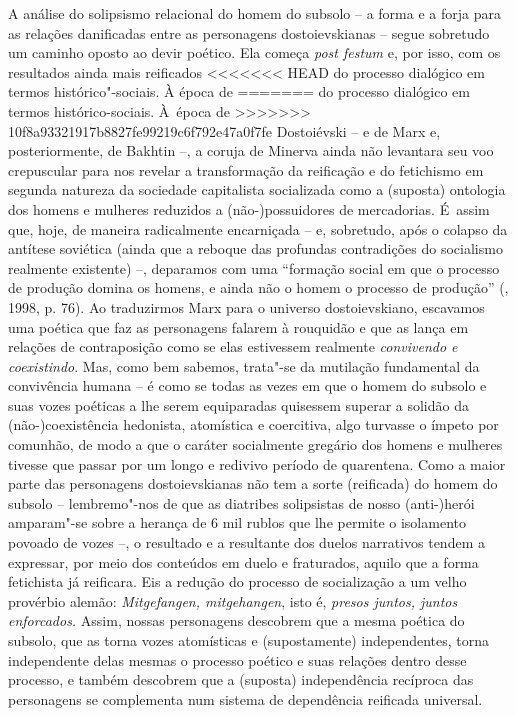 {A análise do solipsismo relacional do homem do subsolo -- a forma e a
forja para as relações danificadas entre as personagens dostoievskianas
-- segue sobretudo um caminho oposto ao devir poético. Ela começa
\emph{post festum} e, por isso, com os resultados ainda mais reificados
<<<<<<< HEAD
do processo dialógico em termos histórico"-sociais. À época de
=======
do processo dialógico em termos histórico-sociais. À~época de
>>>>>>> 10f8a93321917b8827fe99219c6f792e47a0f7fe
Dostoiévski -- e de Marx e, posteriormente, de Bakhtin --, a coruja de
Minerva ainda não levantara seu voo crepuscular para nos revelar a
transformação da reificação e do fetichismo em segunda natureza da
sociedade capitalista socializada como a (suposta) ontologia dos homens
e mulheres reduzidos a (não-)possuidores de mercadorias. É~assim que,
hoje, de maneira radicalmente encarniçada -- e, sobretudo, após o
colapso da antítese soviética (ainda que a reboque das profundas
contradições do socialismo realmente existente) --, deparamos com uma
``formação social em que o processo de produção domina os homens, e
ainda não o homem o processo de produção'' (, 1998, p. 76). Ao
traduzirmos Marx para o universo dostoievskiano, escavamos uma poética
que faz as personagens falarem à rouquidão e que as lança em relações de
contraposição como se elas estivessem realmente \emph{convivendo e
coexistindo}. Mas, como bem sabemos, trata"-se da mutilação fundamental
da convivência humana -- é como se todas as vezes em que o homem do
subsolo e suas vozes poéticas a lhe serem equiparadas quisessem superar
a solidão da (não-)coexistência hedonista, atomística e coercitiva, algo
turvasse o ímpeto por comunhão, de modo a que o caráter socialmente
gregário dos homens e mulheres tivesse que passar por um longo e
redivivo período de quarentena. Como a maior parte das personagens
dostoievskianas não tem a sorte (reificada) do homem do subsolo --
lembremo"-nos de que as diatribes solipsistas de nosso (anti-)herói
amparam"-se sobre a herança de 6 mil rublos que lhe permite o isolamento
povoado de vozes --, o resultado e a resultante dos duelos narrativos
tendem a expressar, por meio dos conteúdos em duelo e fraturados, aquilo
que a forma fetichista já reificara. Eis a redução do processo de
socialização a um velho provérbio alemão: \emph{Mitgefangen,
mitgehangen}, isto é, \emph{presos juntos, juntos enforcados.} Assim,
nossas personagens descobrem que a mesma poética do subsolo, que as
torna vozes atomísticas e (supostamente) independentes, torna
independente delas mesmas o processo poético e suas relações dentro
desse processo, e também descobrem que a (suposta) independência
recíproca das personagens se complementa num sistema de dependência
reificada universal.

}

